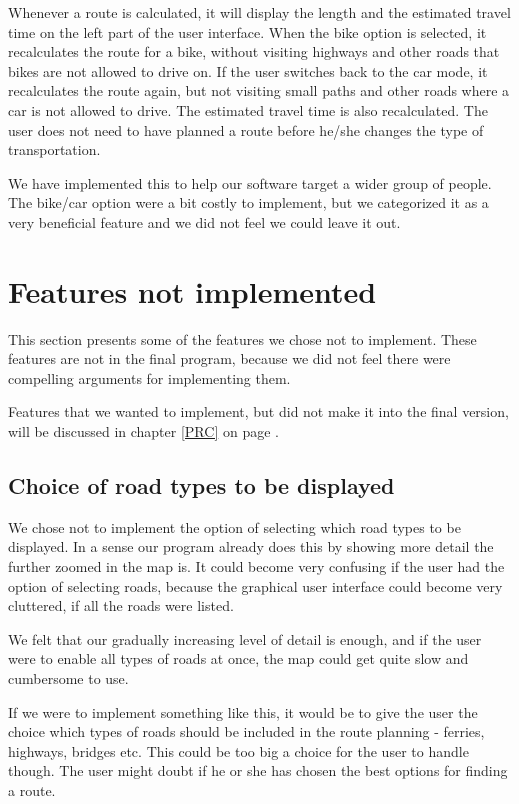 Whenever a route is calculated, it will display the length and the estimated
travel time on the left part of the user interface. When the bike option is selected, 
it recalculates the route for a bike, without visiting highways and other roads 
that bikes are not allowed to drive on. If the user switches back to the 
car mode, it recalculates the route again, but not visiting small paths and other 
roads where a car is not allowed to drive. The estimated travel time is also 
recalculated. The user does not need to have planned a route before he/she 
changes the type of transportation.

We have implemented this to help our software target a wider group of people.
The bike/car option were a bit costly to implement, but we categorized it as a
very beneficial feature and we did not feel we could leave it out.

\section{Features not implemented}
\label{UIA-NI}
This section presents some of the features we chose not to implement.
These features are not in the final program, because we did not feel there were
compelling arguments for implementing them.

Features that we wanted to implement, but did not make it into the final version,
will be discussed in chapter \ref{PRC}  on page
\pageref{PRC}.

\subsection{Choice of road types to be displayed}
\label{UIA-NI-CRD}
We chose not to implement the option of selecting which road types to be
displayed. In a sense our program already does this by showing more detail the
further zoomed in the map is. It could become very confusing if the user had the
option of selecting roads, because the graphical user interface could become
very cluttered, if all the roads were listed.

We felt that our gradually increasing level of detail is enough, and if the user were 
to enable all types of roads at once, the map could get quite slow and cumbersome 
to use.

If we were to implement something like this, it would be to give the user the choice 
which types of roads should be included in the route planning - ferries, highways, 
bridges etc. This could be too big a choice for the user to handle though. The
user might doubt if he or she has chosen the best options for finding a route.

